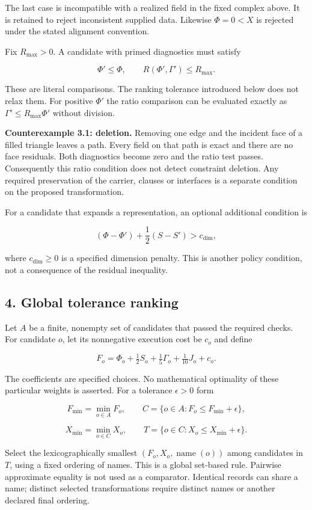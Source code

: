 \documentclass[
]{article}
\begin{document}
The last case is incompatible with a realized field in the fixed complex
above. It is retained to reject inconsistent supplied data. Likewise
\(\Phi=0<X\) is rejected under the stated alignment convention.

Fix \(R_{\max}>0\). A candidate with primed diagnostics must satisfy

\[
\Phi'\le\Phi,\qquad R(\Phi',\Gamma')\le R_{\max}.
\]

These are literal comparisons. The ranking tolerance introduced below
does not relax them. For positive \(\Phi'\) the ratio comparison can be
evaluated exactly as \(\Gamma'\le R_{\max}\Phi'\) without division.

\textbf{Counterexample 3.1: deletion.} Removing one edge and the
incident face of a filled triangle leaves a path. Every field on that
path is exact and there are no face residuals. Both diagnostics become
zero and the ratio test passes. Consequently this ratio condition does
not detect constraint deletion. Any required preservation of the
carrier, clauses or interfaces is a separate condition on the proposed
transformation.

For a candidate that expands a representation, an optional additional
condition is

\[
(\Phi-\Phi')+\frac12(S-S')>c_{\mathrm{dim}},
\]

where \(c_{\mathrm{dim}}\ge0\) is a specified dimension penalty. This is
another policy condition, not a consequence of the residual inequality.

\subsection{4. Global tolerance ranking}\label{global-tolerance-ranking}

Let \(A\) be a finite, nonempty set of candidates that passed the
required checks. For candidate \(o\), let its nonnegative execution cost
be \(c_o\) and define

\[
F_o=\Phi_o+\tfrac12S_o+\tfrac15\Gamma_o+\tfrac1{10}J_o+c_o.
\]

The coefficients are specified choices. No mathematical optimality of
these particular weights is asserted. For a tolerance \(\epsilon>0\)
form

\[
F_{\min}=\min_{o\in A}F_o,\qquad
C=\{o\in A:F_o\le F_{\min}+\epsilon\},
\]

\[
X_{\min}=\min_{o\in C}X_o,\qquad
T=\{o\in C:X_o\le X_{\min}+\epsilon\}.
\]

Select the lexicographically smallest
\((F_o,X_o,\operatorname{name}(o))\) among candidates in \(T\), using a
fixed ordering of names. This is a global set-based rule. Pairwise
approximate equality is not used as a comparator. Identical records can
share a name; distinct selected transformations require distinct names
or another declared final ordering.
\end{document}
